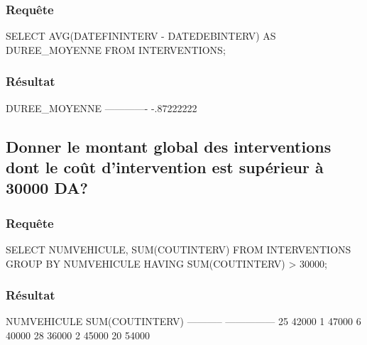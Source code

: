 \documentclass[•]{article}
\begin{document}
\subsubsection{Requête}
\begin{sql}
SELECT AVG(DATEFININTERV - DATEDEBINTERV) AS DUREE_MOYENNE FROM INTERVENTIONS;\end{sql}
\subsubsection{Résultat}
\begin{sql}
    DUREE_MOYENNE                                                                   
    -------------                                                                   
       -.87222222                                                                       
\end{sql}
\subsection{Donner le montant global des interventions dont le coût d’intervention est supérieur à 30000 DA?}
\subsubsection{Requête}
\begin{sql}
SELECT NUMVEHICULE, SUM(COUTINTERV) FROM INTERVENTIONS GROUP BY NUMVEHICULE HAVING SUM(COUTINTERV) > 30000;
\end{sql}
\subsubsection{Résultat}
\begin{sql}
    NUMVEHICULE SUM(COUTINTERV)                                                     
    ----------- ---------------                                                     
             25           42000                                                     
              1           47000                                                     
              6           40000                                                     
             28           36000                                                     
              2           45000                                                     
             20           54000 
\end{sql}
\end{document}
